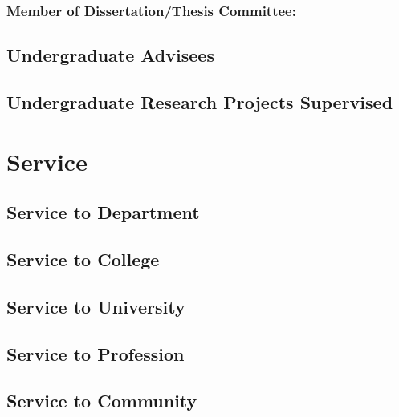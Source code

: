 \documentclass[10pt]{article}
\begin{document}
    \subsubsection{Member of Dissertation/Thesis Committee:}
    \begin{enumerate}

    \end{enumerate}
  \subsection{Undergraduate Advisees}
  \begin{enumerate}

  \end{enumerate}
  \subsection{Undergraduate Research Projects Supervised}
  \begin{enumerate}

  \end{enumerate}
\fi

\section{Service}
\iftrue
  \subsection{Service to Department}
  \begin{description}

  \end{description}

  \subsection{Service to College}
  \begin{description}

  \end{description}

  \subsection{Service to University}
  \begin{description}

  \end{description}
\fi
  \subsection{Service to Profession}
  \begin{description}

  \end{description}
  \subsection{Service to Community}
  \begin{description}

  \end{description}
\end{document}

